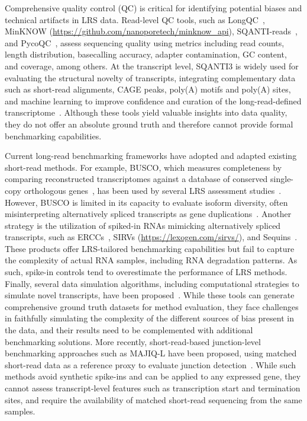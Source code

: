 \documentclass[pdflatex,sn-nature]{sn-jnl}%
\begin{document}
Comprehensive quality control (QC) is critical for identifying potential biases and technical artifacts in LRS data. Read-level QC tools, such as LongQC~\cite{fukasawa_longqc_2020}, MinKNOW (\url{https://github.com/nanoporetech/minknow_api}), SQANTI-reads~\cite{keil_quality_2025}, and PycoQC~\cite{leger_pycoqc_2019}, assess sequencing quality using metrics including read counts, length distribution, basecalling accuracy, adapter contamination, GC content, and coverage, among others. At the transcript level, SQANTI3 is widely used for evaluating the structural novelty of transcripts, integrating complementary data such as short-read alignments, CAGE peaks, poly(A) motifs and poly(A) sites, and machine learning to improve confidence and curation of the long-read-defined transcriptome~\cite{pardo-palacios_sqanti3_2024}. Although these tools yield valuable insights into data quality, they do not offer an absolute ground truth and therefore cannot provide formal benchmarking capabilities.

Current long-read benchmarking frameworks have adopted and adapted existing short-read methods. For example, BUSCO, which measures completeness by comparing reconstructed transcriptomes against a database of conserved single-copy orthologous genes~\cite{simao_busco_2015}, has been used by several LRS assessment studies~\cite{velasco_long-read_2023,nip_reference-free_2023,pardo-palacios_systematic_2024}. However, BUSCO is limited in its capacity to evaluate isoform diversity, often misinterpreting alternatively spliced transcripts as gene duplications~\cite{nenasheva_annotation_2025,paniagua_evaluation_2025}. Another strategy is the utilization of spiked-in RNAs mimicking alternatively spliced transcripts, such as ERCCs~\cite{jiang_synthetic_2011}, SIRVs (\url{https://lexogen.com/sirvs/}), and Sequins~\cite{hardwick_spliced_2016}. These products offer LRS-tailored benchmarking capabilities but fail to capture the complexity of actual RNA samples, including RNA degradation patterns. As such, spike-in controls tend to overestimate the performance of LRS methods. Finally, several data simulation algorithms, including computational strategies to simulate novel transcripts, have been proposed~\cite{yang_nanosim_2017,ono_pbsim3_2022,mestre-tomas_sqanti-sim_2023}. While these tools can generate comprehensive ground truth datasets for method evaluation, they face challenges in faithfully simulating the complexity of the different sources of bias present in the data, and their results need to be complemented with additional benchmarking solutions. More recently, short-read-based junction-level benchmarking approaches such as MAJIQ-L have been proposed, using matched short-read data as a reference proxy to evaluate junction detection~\cite{han_contrasting_2024}. While such methods avoid synthetic spike-ins and can be applied to any expressed gene, they cannot assess transcript-level features such as transcription start and termination sites, and require the availability of matched short-read sequencing from the same samples.
\end{document}
